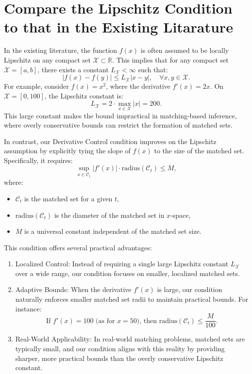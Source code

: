 \documentclass{mytemplate}
\begin{document}
\section{Compare the Lipschitz Condition to that in the Existing Litarature}

In the existing literature, the function $f(x)$ is often assumed to be locally Lipschitz on any compact set $\mathcal{X} \subset \mathbb{R}$. This implies that for any compact set $\mathcal{X} = [a, b]$, there exists a constant $L_\mathcal{X} < \infty$ such that:
\[
|f(x) - f(y)| \leq L_\mathcal{X} |x - y|, \quad \forall x, y \in \mathcal{X}.
\]
For example, consider $f(x) = x^2$, where the derivative $f'(x) = 2x$. On $\mathcal{X} = [0, 100]$, the Lipschitz constant is:
\[
L_\mathcal{X} = 2 \cdot \max_{x \in \mathcal{X}} |x| = 200.
\]
This large constant makes the bound impractical in matching-based inference, where overly conservative bounds can restrict the formation of matched sets. 

In contrast, our Derivative Control condition improves on the Lipschitz assumption by explicitly tying the slope of $f(x)$ to the size of the matched set. Specifically, it requires:
\[
\sup_{x \in \mathcal{C}_t} \bigl|f'(x)\bigr| \cdot \mathrm{radius}(\mathcal{C}_t) \leq M,
\]
where:
\begin{itemize}
    \item $\mathcal{C}_t$ is the matched set for a given $t$,
    \item $\mathrm{radius}(\mathcal{C}_t)$ is the diameter of the matched set in $x$-space,
    \item $M$ is a universal constant independent of the matched set size.
\end{itemize}

This condition offers several practical advantages:
\begin{enumerate}
    \item Localized Control: Instead of requiring a single large Lipschitz constant $L_\mathcal{X}$ over a wide range, our condition focuses on smaller, localized matched sets.
    \item Adaptive Bounds: When the derivative $f'(x)$ is large, our condition naturally enforces smaller matched set radii to maintain practical bounds. For instance:
    \[
    \text{If } f'(x) = 100 \text{ (as for } x = 50 \text{), then } \mathrm{radius}(\mathcal{C}_t) \leq \frac{M}{100}.
    \]
    \item Real-World Applicability: In real-world matching problems, matched sets are typically small, and our condition aligns with this reality by providing sharper, more practical bounds than the overly conservative Lipschitz constant.
\end{enumerate}
\end{document}
